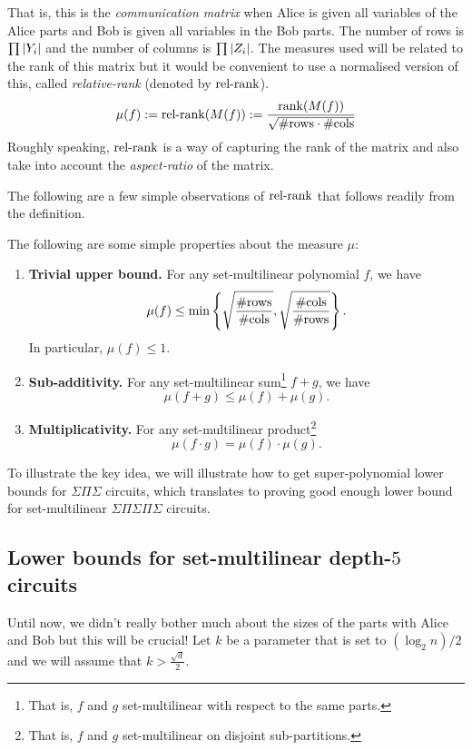 That is, this is the \emph{communication matrix} when Alice is given all variables of the Alice parts and Bob is given all variables in the Bob parts. The number of rows is $\prod \left|Y_i\right|$ and the number of columns is $\prod \left|Z_i\right|$. The measures used will be related to the rank of this matrix but it would be convenient to use a normalised version of this, called \emph{relative-rank} (denoted by $\operatorname{rel-rank}$).
\[
  \mu(f) := \operatorname{rel-rank}(M(f)) := \frac{\operatorname{rank}(M(f))}{\sqrt{\#\text{rows} \cdot \#\text{cols}}}
\]
Roughly speaking, $\operatorname{rel-rank}$ is a way of capturing the rank of the matrix and also take into account the \emph{aspect-ratio} of the matrix.

The following are a few simple observations of $\operatorname{rel-rank}$ that follows readily from the definition.
\begin{observation}
  The following are some simple properties about the measure $\mu$:
  \begin{enumerate}
  \item \textbf{Trivial upper bound.} For any set-multilinear polynomial $f$, we have
    \[
      \mu(f) \leq \min\left\{\sqrt{\frac{\#\text{rows}}{\#\text{cols}}}, \sqrt{\frac{\#\text{cols}}{\#\text{rows}}}\right\}. 
    \]
    In particular, $\mu(f) \leq 1$.
  \item \textbf{Sub-additivity.} For any set-multilinear sum\footnote{That is, $f$ and $g$ set-multilinear with respect to the same parts.} $f+g$, we have
    \[
      \mu(f+g) \leq \mu(f) + \mu(g).
    \]
  \item \textbf{Multiplicativity.} For any set-multilinear product\footnote{That is, $f$ and $g$ set-multilinear on disjoint sub-partitions.}
    \[
      \mu(f \cdot g) = \mu(f) \cdot \mu(g).
    \]
  \end{enumerate}
\end{observation}

To illustrate the key idea, we will illustrate how to get super-polynomial lower bounds for $\Sigma\Pi\Sigma$ circuits, which translates to proving good enough lower bound for set-multilinear $\Sigma\Pi\Sigma\Pi\Sigma$ circuits. 

\subsection{Lower bounds for set-multilinear depth-$5$ circuits}

Until now, we didn't really bother much about the sizes of the parts with Alice and Bob but this will be crucial! Let $k$ be a parameter that is set to $(\log_2 n)/2$ and we will assume that $k > \frac{\sqrt{d}}{2}$.

